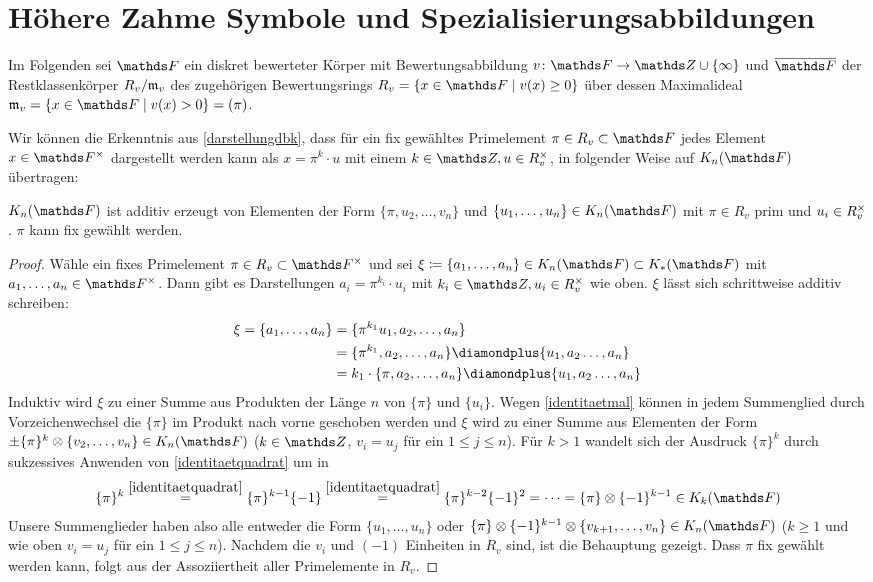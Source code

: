 \documentclass[ngerman,fontsize=11pt, paper=a4, parskip=half, titlepage=true, toc=bib]{scrartcl}
\begin{document}
\section{Höhere Zahme Symbole und Spezialisierungsabbildungen}
Im Folgenden sei $\F$ ein diskret bewerteter Körper mit
Bewertungsabbildung $v\colon \F\to\Z\cup\{\infty\}$ und
$\overline{\F}$ der Restklassenkörper $R_v/\mathfrak{m}_v$ 
des zugehörigen Bewertungsrings $R_v=\left\{x\in\F\mid v(x)\geq0\right\}$
über dessen Maximalideal $\frakm_v=\left\{x\in\F\mid v(x)>0\right\}=(\pi)$.

Wir können die Erkenntnis aus \ref{darstellungdbk},
dass für ein fix gewähltes Primelement $\pi\in R_v\subset \F$
jedes Element $x\in\Fx$ dargestellt werden kann als 
$x=\pi^k\cdot u$ mit einem $k\in\Z, u\in \Rx_v$,
in folgender Weise auf $\KnF$ übertragen:

\begin{Lem}\label{darstellungknf}
  $\KnF$ ist additiv erzeugt von Elementen der Form 
  $\{\pi, u_{2},\dotsc,v_n\}$
  und $\{u_{1},\dotsc,u_n\}\in\KnF$ mit $\pi\in R_v$ prim und
  $u_i\in R^\times_v$.
  $\pi$ kann fix gewählt werden.
  \begin{proof}
    Wähle ein fixes Primelement $\pi\in R_v\subset\Fx$
    und sei $\xi\coloneqq\{a_1,\dotsc, a_n\}\in\KnF\subset\KF$ mit
    $a_1,\dotsc,a_n\in\Fx$. Dann gibt es Darstellungen
    $a_i=\pi^{k_i}\cdot u_i$ mit $k_i\in\Z,u_i\in \Rx_v$ wie
    oben. $\xi$ lässt sich schrittweise additiv schreiben:
    \begin{align*}
      \xi=\{a_1,\dotsc,a_n\}
      &=\{\pi^{k_1}u_1, a_2, \dotsc, a_n\}\\
      &=\{\pi^{k_1}, a_2, \dotsc, a_n\}
        \p\{u_1, a_2 \dotsc, a_n\}\\
      &=k_1\cdot \{\pi,a_2, \dotsc, a_n\}
        \p\{u_1, a_2 \dotsc, a_n\}
    \end{align*}
    Induktiv wird $\xi$ zu einer Summe aus Produkten der Länge $n$ von
    $\{\pi\}$ und $\{u_i\}$.
    Wegen \ref{identitaetmal} können in jedem Summenglied durch
    Vorzeichenwechsel die $\{\pi\}$ im Produkt nach vorne geschoben werden
    und $\xi$ wird zu einer Summe aus Elementen der Form
    $\pm\{\pi\}^k\otimes\{v_{2},\dotsc,v_n\}\in\KnF$ 
    ($k\in\Z$, $v_i=u_j$ für ein $1\leq j\leq n$).
    Für $k>1$ wandelt sich der Ausdruck $\{\pi\}^k$ durch
    sukzessives Anwenden von \ref{identitaetquadrat} um in
    \begin{gather*}
      \{\pi\}^k
      \overset{\ref{identitaetquadrat}}{=} \{\pi\}^{k-1}\{-1\}
      \overset{\ref{identitaetquadrat}}{=} \{\pi\}^{k-2}\{-1\}^2
      =\dotsb=\{\pi\}\otimes\{-1\}^{k-1} \in\K_{k}(\F)
    \end{gather*}
    Unsere Summenglieder haben also alle entweder die Form 
    $\{u_1,\dotsc, u_n\}$ oder
    $\{\pi\}\otimes\{-1\}^{k-1}\otimes\{v_{k+1},\dotsc,v_n\}\in\KnF$
    ($k\geq 1$ und wie oben $v_i=u_j$ für ein $1\leq j\leq n$).
    Nachdem die $v_i$ und $(-1)$ Einheiten in $R_v$ sind,
    ist die Behauptung gezeigt.
    Dass $\pi$ fix gewählt werden kann, folgt aus der Assoziiertheit
    aller Primelemente in $R_v$.
  \end{proof}
\end{Lem}
\end{document}
